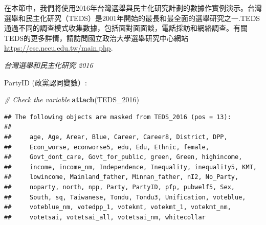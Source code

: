 \documentclass[]{book}
\newenvironment{Shaded}{\begin{snugshade}}{\end{snugshade}}
\newcommand{\CommentTok}[1]{\textcolor[rgb]{0.56,0.35,0.01}{\textit{#1}}}
\newcommand{\DataTypeTok}[1]{\textcolor[rgb]{0.13,0.29,0.53}{#1}}
\newcommand{\DecValTok}[1]{\textcolor[rgb]{0.00,0.00,0.81}{#1}}
\newcommand{\KeywordTok}[1]{\textcolor[rgb]{0.13,0.29,0.53}{\textbf{#1}}}
\newcommand{\NormalTok}[1]{#1}
\newcommand{\OperatorTok}[1]{\textcolor[rgb]{0.81,0.36,0.00}{\textbf{#1}}}
\newcommand{\StringTok}[1]{\textcolor[rgb]{0.31,0.60,0.02}{#1}}
\begin{document}
在本節中，我們將使用2016年台灣選舉與民主化研究計劃的數據作實例演示。台灣選舉和民主化研究（TEDS）是2001年開始的最長和最全面的選舉研究之一.TEDS通過不同的調查模式收集數據，包括面對面面談，電話採訪和網絡調查。有關TEDS的更多詳情，請訪問國立政治大學選舉研究中心網站 \url{https://esc.nccu.edu.tw/main.php}.

\emph{台灣選舉和民主化研究 2016}

\begin{Shaded}
\end{Shaded}

PartyID (政黨認同變數）:

\begin{Shaded}
\begin{Highlighting}[]
\CommentTok{# Check the variable}
\KeywordTok{attach}\NormalTok{(TEDS_}\DecValTok{2016}\NormalTok{)}
\end{Highlighting}
\end{Shaded}

\begin{verbatim}
## The following objects are masked from TEDS_2016 (pos = 13):
## 
##     age, Age, Arear, Blue, Career, Career8, District, DPP,
##     Econ_worse, econworse5, edu, Edu, Ethnic, female,
##     Govt_dont_care, Govt_for_public, green, Green, highincome,
##     income, income_nm, Independence, Inequality, inequality5, KMT,
##     lowincome, Mainland_father, Minnan_father, nI2, No_Party,
##     noparty, north, npp, Party, PartyID, pfp, pubwelf5, Sex,
##     South, sq, Taiwanese, Tondu, Tondu3, Unification, voteblue,
##     voteblue_nm, votedpp_1, votekmt, votekmt_1, votekmt_nm,
##     votetsai, votetsai_all, votetsai_nm, whitecollar
\end{verbatim}
\end{document}
